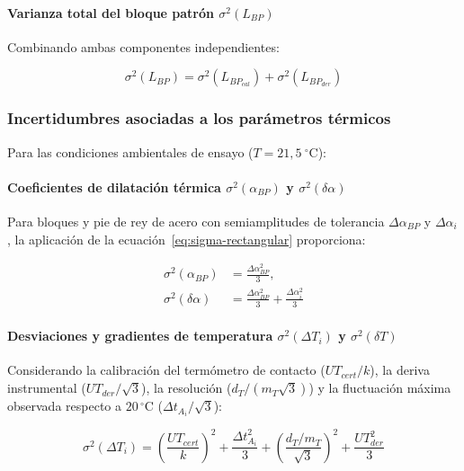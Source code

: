 \paragraph{Varianza total del bloque patrón $\sigma^2(L_{BP})$}
Combinando ambas componentes independientes:

\begin{equation}
    \sigma^2(L_{BP}) = \sigma^2(L_{BP_{cal}}) + \sigma^2(L_{BP_{der}})
    \label{eq:sigma-LBP-total}
\end{equation}

\subsubsection{Incertidumbres asociadas a los parámetros térmicos}

Para las condiciones ambientales de ensayo ($T = 21{,}5\ ^\circ\text{C}$):

\paragraph{Coeficientes de dilatación térmica $\sigma^2(\alpha_{BP})$ y $\sigma^2(\delta\alpha)$}
Para bloques y pie de rey de acero con semiamplitudes de tolerancia $\Delta\alpha_{BP}$ y $\Delta\alpha_i$, la aplicación de la ecuación~\eqref{eq:sigma-rectangular} proporciona:

\begin{align}
    \sigma^2(\alpha_{BP}) &= \frac{\Delta\alpha_{BP}^2}{3}, \label{eq:sigma-alpha-BP} \\
    \sigma^2(\delta\alpha) &= \frac{\Delta\alpha_{BP}^2}{3} + \frac{\Delta\alpha_i^2}{3} \label{eq:sigma-dalpha}
\end{align}

\paragraph{Desviaciones y gradientes de temperatura $\sigma^2(\Delta T_i)$ y $\sigma^2(\delta T)$}
Considerando la calibración del termómetro de contacto ($UT_{cert}/k$), la deriva instrumental ($UT_{der}/\sqrt{3}$), la resolución ($d_T / (m_T \sqrt{3})$) y la fluctuación máxima observada respecto a $20\,^\circ\text{C}$ ($\Delta t_{A_i}/\sqrt{3}$):

\begin{equation}
    \sigma^2(\Delta T_i) = \left(\frac{UT_{cert}}{k}\right)^2 + \frac{\Delta t_{A_i}^2}{3} + \left(\frac{d_T / m_T}{\sqrt{3}}\right)^2 + \frac{UT_{der}^2}{3}
    \label{eq:sigma-deltaTi}
\end{equation}


